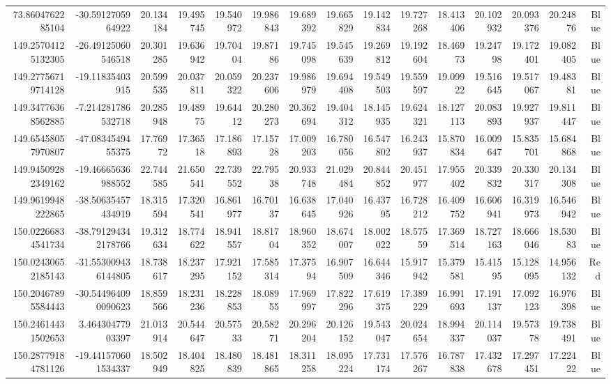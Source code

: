 \begin{center}
\begin{longtable}{rrrrrrrrrrrrrrr}
73.8604762285104 & -30.5912705964922 & 20.134184 & 19.495745 & 19.540972 & 19.986843 & 19.689392 & 19.665829 & 19.142834 & 19.727268 & 18.413406 & 20.102932 & 20.093376 & 20.24876 & Blue \\
149.25704125132305 & -26.49125060546518 & 20.301285 & 19.636942 & 19.70404 & 19.87186 & 19.745098 & 19.545639 & 19.269812 & 19.192604 & 18.46973 & 19.24798 & 19.172401 & 19.082405 & Blue \\
149.27756719714128 & -19.11835403915 & 20.599535 & 20.037811 & 20.059322 & 20.237606 & 19.986979 & 19.694408 & 19.549503 & 19.559597 & 19.09922 & 19.516645 & 19.517067 & 19.48381 & Blue \\
149.34776368562885 & -7.214281786532718 & 20.285948 & 19.48975 & 19.64412 & 20.280273 & 20.362694 & 19.404312 & 18.145935 & 19.624321 & 18.127113 & 20.083893 & 19.927937 & 19.811447 & Blue \\
149.65458057970807 & -47.0834549455375 & 17.76972 & 17.36518 & 17.186893 & 17.15728 & 17.009203 & 16.780056 & 16.547802 & 16.243937 & 15.870834 & 16.009647 & 15.835701 & 15.684868 & Blue \\
149.94509282349162 & -19.46665636988552 & 22.744585 & 21.650541 & 22.739552 & 22.79538 & 20.933748 & 21.029484 & 20.844852 & 20.451977 & 17.955402 & 20.339832 & 20.330317 & 20.134308 & Blue \\
149.9619948222865 & -38.50635457434919 & 18.315594 & 17.320541 & 16.861977 & 16.70137 & 16.638645 & 17.040926 & 16.43795 & 16.728212 & 16.409752 & 16.606941 & 16.319973 & 16.546942 & Blue \\
150.02266834541734 & -38.791294342178766 & 19.312634 & 18.774622 & 18.941557 & 18.81704 & 18.960352 & 18.674007 & 18.002022 & 18.57559 & 17.369514 & 18.727163 & 18.666046 & 18.53083 & Blue \\
150.02430652185143 & -31.553009436144805 & 18.738617 & 18.237295 & 17.921152 & 17.585314 & 17.37594 & 16.907509 & 16.644346 & 15.917942 & 15.379581 & 15.41595 & 15.128095 & 14.956132 & Red \\
150.20467895584443 & -30.544964090090623 & 18.859566 & 18.231236 & 18.228853 & 18.08955 & 17.969997 & 17.822296 & 17.619375 & 17.389229 & 16.991693 & 17.191137 & 17.092123 & 16.976398 & Blue \\
150.24614431502653 & 3.46430477903397 & 21.013914 & 20.544647 & 20.57533 & 20.58271 & 20.296204 & 20.126152 & 19.543047 & 20.024654 & 18.994337 & 20.114037 & 19.57378 & 19.738491 & Blue \\
150.28779184781126 & -19.441570601534337 & 18.502949 & 18.404825 & 18.480839 & 18.481865 & 18.311258 & 18.095224 & 17.731174 & 17.576267 & 16.787838 & 17.432678 & 17.297451 & 17.22422 & Blue \\

\end{longtable}
\end{center}
